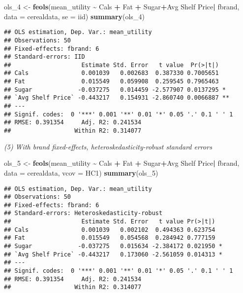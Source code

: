 \documentclass[
]{article}
\newenvironment{Shaded}{\begin{snugshade}}{\end{snugshade}}
\newcommand{\AttributeTok}[1]{\textcolor[rgb]{0.13,0.29,0.53}{#1}}
\newcommand{\FunctionTok}[1]{\textcolor[rgb]{0.13,0.29,0.53}{\textbf{#1}}}
\newcommand{\NormalTok}[1]{#1}
\newcommand{\OtherTok}[1]{\textcolor[rgb]{0.56,0.35,0.01}{#1}}
\newcommand{\SpecialCharTok}[1]{\textcolor[rgb]{0.81,0.36,0.00}{\textbf{#1}}}
\newcommand{\StringTok}[1]{\textcolor[rgb]{0.31,0.60,0.02}{#1}}
\begin{document}
\begin{Shaded}
\begin{Highlighting}[]
\NormalTok{ols\_4 }\OtherTok{\textless{}{-}} \FunctionTok{feols}\NormalTok{(mean\_utility }\SpecialCharTok{\textasciitilde{}}\NormalTok{ Cals }\SpecialCharTok{+}\NormalTok{ Fat }\SpecialCharTok{+}\NormalTok{ Sugar}\SpecialCharTok{+}\StringTok{\textasciigrave{}}\AttributeTok{Avg Shelf Price}\StringTok{\textasciigrave{}}\SpecialCharTok{|}\NormalTok{ fbrand, }\AttributeTok{data =}\NormalTok{ cerealdata,}
                     \AttributeTok{se =} \StringTok{\textquotesingle{}iid\textquotesingle{}}\NormalTok{)}
\FunctionTok{summary}\NormalTok{(ols\_4)}
\end{Highlighting}
\end{Shaded}

\begin{verbatim}
## OLS estimation, Dep. Var.: mean_utility
## Observations: 50
## Fixed-effects: fbrand: 6
## Standard-errors: IID 
##                    Estimate Std. Error   t value  Pr(>|t|)    
## Cals               0.001039   0.002683  0.387330 0.7005651    
## Fat                0.015549   0.059908  0.259545 0.7965463    
## Sugar             -0.037275   0.014459 -2.577907 0.0137295 *  
## `Avg Shelf Price` -0.443217   0.154931 -2.860740 0.0066887 ** 
## ---
## Signif. codes:  0 '***' 0.001 '**' 0.01 '*' 0.05 '.' 0.1 ' ' 1
## RMSE: 0.391354     Adj. R2: 0.241534
##                  Within R2: 0.314077
\end{verbatim}

\emph{(5) With brand fixed-effects, heteroskedasticity-robust standard
errors}

\begin{Shaded}
\begin{Highlighting}[]
\NormalTok{ols\_5 }\OtherTok{\textless{}{-}} \FunctionTok{feols}\NormalTok{(mean\_utility }\SpecialCharTok{\textasciitilde{}}\NormalTok{ Cals }\SpecialCharTok{+}\NormalTok{ Fat }\SpecialCharTok{+}\NormalTok{ Sugar}\SpecialCharTok{+}\StringTok{\textasciigrave{}}\AttributeTok{Avg Shelf Price}\StringTok{\textasciigrave{}}\SpecialCharTok{|}\NormalTok{ fbrand, }\AttributeTok{data =}\NormalTok{ cerealdata,}
                     \AttributeTok{vcov =} \StringTok{\textquotesingle{}HC1\textquotesingle{}}\NormalTok{)}
\FunctionTok{summary}\NormalTok{(ols\_5)}
\end{Highlighting}
\end{Shaded}

\begin{verbatim}
## OLS estimation, Dep. Var.: mean_utility
## Observations: 50
## Fixed-effects: fbrand: 6
## Standard-errors: Heteroskedasticity-robust 
##                    Estimate Std. Error   t value Pr(>|t|)    
## Cals               0.001039   0.002102  0.494363 0.623754    
## Fat                0.015549   0.054568  0.284942 0.777159    
## Sugar             -0.037275   0.015634 -2.384172 0.021950 *  
## `Avg Shelf Price` -0.443217   0.173060 -2.561059 0.014313 *  
## ---
## Signif. codes:  0 '***' 0.001 '**' 0.01 '*' 0.05 '.' 0.1 ' ' 1
## RMSE: 0.391354     Adj. R2: 0.241534
##                  Within R2: 0.314077
\end{verbatim}
\end{document}
